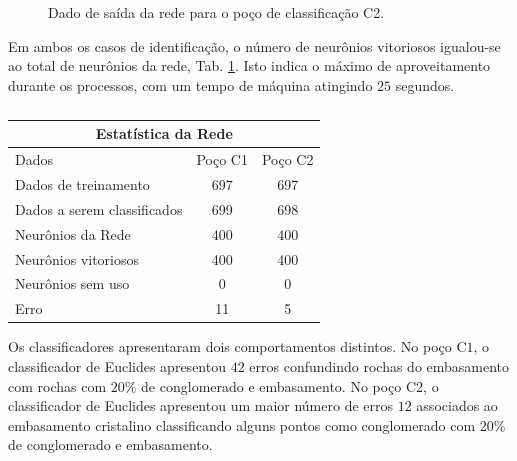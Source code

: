 \begin{figure}[H]
	\centering
	\setlength{\fboxsep}{8pt}
	\setlength{\fboxrule}{0.1pt}
	\caption{Dado de saída da rede para o poço de classificação C2.}
	\label{Class C2}
\end{figure} 


Em ambos os casos de identificação, o número de neurônios vitoriosos igualou-se ao total de neurônios da rede, Tab. \ref{Estatistica da rede}. Isto indica o máximo de aproveitamento durante os processos, com um tempo de máquina atingindo $25$ segundos. 


\begin{table}[H]
	\centering
	\caption{}
	\label{Estatistica da rede}
	\begin{tabular}{@{}lcc@{}}
		\toprule
		\multicolumn{3}{c}{Estatística da Rede}         \\ \midrule
		Dados                       & Poço C1 & Poço C2 \\
		Dados de treinamento        & 697     & 697     \\
		Dados a serem classificados & 699     & 698     \\
		Neurônios da Rede           & 400     & 400     \\
		Neurônios vitoriosos        & 400     & 400     \\
		Neurônios sem uso           & 0       & 0       \\
		Erro                        & 11      & 5       \\ \bottomrule
	\end{tabular}
\end{table} 


 Os classificadores apresentaram dois comportamentos distintos. No poço C$1$, o classificador de Euclides apresentou $42$ erros confundindo rochas do embasamento com rochas com $20\%$ de conglomerado e embasamento. No poço C$2$, o classificador de Euclides apresentou um maior número de erros $12$ associados ao embasamento cristalino classificando alguns pontos como conglomerado com $20\%$ de conglomerado e embasamento. 


